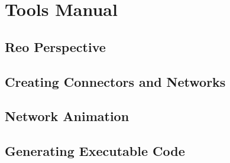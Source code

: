 
\section{Tools Manual}

\subsection{Reo Perspective}

\subsection{Creating Connectors and Networks}

\subsection{Network Animation}

\subsection{Generating Executable Code}

